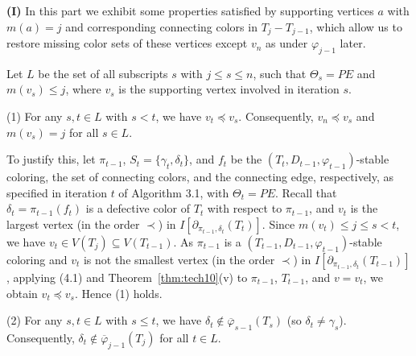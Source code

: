 \documentclass[11pt]{article}
\newcommand{\phibar}{\overline{\varphi}}
\begin{document}
\vskip 2mm

{\bf (I)} In this part we exhibit some properties satisfied by supporting vertices $a$ with $m(a)=j$ and corresponding 
connecting colors in $T_j-T_{j-1}$, which allow us to restore missing color sets of these vertices except $v_n$ as 
under $\varphi_{j-1}$ later. 

Let $L$ be the set of all subscripts $s$ with $j\le s\le n$, such that $\Theta_s=PE$ and $m(v_s) \le j$, where
$v_s$ is the supporting vertex involved in iteration $s$.  

(1) For any $s, t\in L$ with $s< t$, we have $v_t \preceq v_s$. Consequently, $v_n\preceq  v_s$ and $m(v_s) =j$
for all $s\in L$. 

To justify this, let $\pi_{t-1}$, $S_t=\{\gamma_t, \delta_t\}$, and $f_t$ be the $(T_t,D_{t-1},\varphi_{t-1})$-stable coloring, 
the set of connecting colors, and the connecting edge, respectively, as specified in iteration $t$ of Algorithm 3.1, with 
$\Theta_t=PE$.  Recall that $\delta_{t}=\pi_{t-1}(f_t)$ is a defective color of $T_t$ with respect to $\pi_{t-1}$,
and $v_t$ is the largest vertex (in the order $\prec$) in $I[\partial_{\pi_{t-1}, \delta_{t}}(T_{t})]$.  Since $m(v_t) \le j \le s<t$,
we have $v_t\in V(T_{j}) \subseteq V(T_{t-1})$.  As $\pi_{t-1}$ is a $(T_{t-1}, D_{t-1}, \varphi_{t-1})$-stable coloring and $v_t$ 
is not the smallest vertex (in the order $\prec$) in $I[\partial_{\pi_{t-1}, \delta_t}(T_{t-1})]$, applying (4.1) and Theorem~\ref{thm:tech10}(v) 
to $\pi_{t-1}$, $T_{t-1}$, and $v=v_t$, we obtain $v_t \preceq v_s$. Hence (1) holds.  

(2)  For any $s, t\in L$ with $s\le t$, we have $\delta_{t}\notin \phibar_{s-1}(T_s)$ (so $\delta_t\ne \gamma_s$). Consequently,
$\delta_t \notin \phibar_{j-1}(T_j)$ for all $t\in L$. 
\end{document}
